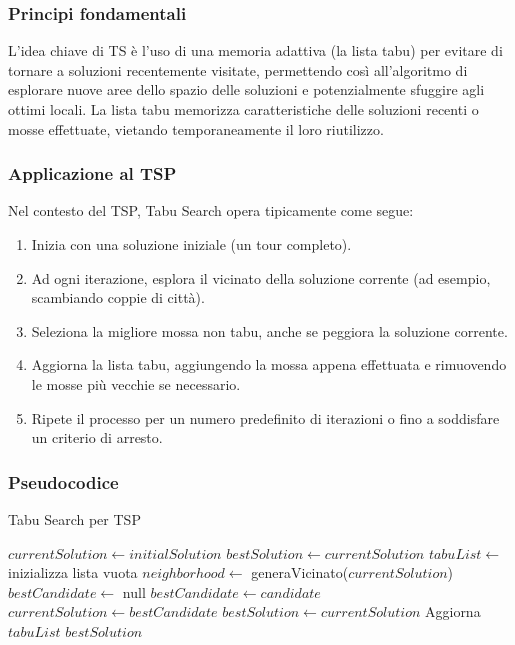 \subsubsection{Principi fondamentali}

L'idea chiave di \gls{TS} è l'uso di una memoria adattiva (la lista tabu) per evitare di tornare a soluzioni recentemente visitate, permettendo così all'algoritmo di esplorare nuove aree dello spazio delle soluzioni e potenzialmente sfuggire agli ottimi locali. La lista tabu memorizza caratteristiche delle soluzioni recenti o mosse effettuate, vietando temporaneamente il loro riutilizzo.

\subsubsection{Applicazione al \gls{TSP}}

Nel contesto del \gls{TSP}, Tabu Search opera tipicamente come segue:

\begin{enumerate}
	\item Inizia con una soluzione iniziale (un tour completo).
	\item Ad ogni iterazione, esplora il vicinato della soluzione corrente (ad esempio, scambiando coppie di città).
	\item Seleziona la migliore mossa non tabu, anche se peggiora la soluzione corrente.
	\item Aggiorna la lista tabu, aggiungendo la mossa appena effettuata e rimuovendo le mosse più vecchie se necessario.
	\item Ripete il processo per un numero predefinito di iterazioni o fino a soddisfare un criterio di arresto.
\end{enumerate}

\subsubsection{Pseudocodice}


\begin{algorithm}
	\caption{Tabu Search per \gls{TSP}}\label{alg:tabusearch}
	\begin{algorithmic}[1]
		\State $currentSolution \gets initialSolution$
		\State $bestSolution \gets currentSolution$
		\State $tabuList \gets$ inizializza lista vuota
		\State $neighborhood \gets$ generaVicinato($currentSolution$)
		\State $bestCandidate \gets$ null
		\State $bestCandidate \gets candidate$
		\EndIf
		\EndFor
		\State $currentSolution \gets bestCandidate$
		\State $bestSolution \gets currentSolution$
		\EndIf
		\State Aggiorna $tabuList$
		\EndFor
		\State \Return $bestSolution$
		\EndProcedure
	\end{algorithmic}
\end{algorithm}

